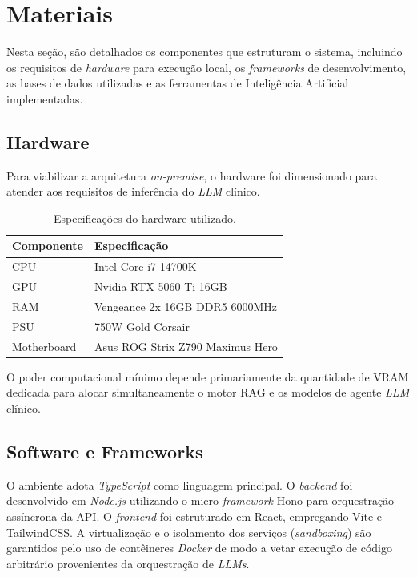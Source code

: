 \documentclass[12pt]{article}
\begin{document}

\section{Materiais}

Nesta seção, são detalhados os componentes que estruturam o sistema, incluindo os requisitos de \textit{hardware} para execução local, os \textit{frameworks} de desenvolvimento, as bases de dados utilizadas e as ferramentas de Inteligência Artificial implementadas.

\subsection{Hardware}
Para viabilizar a arquitetura \textit{on-premise}, o hardware foi dimensionado para atender aos requisitos de inferência do \textit{LLM} clínico.

\begin{table}[H]
  \centering
  \caption{Especificações do hardware utilizado.}
  \label{tab:hardware_specs}
  \small
  \begin{tabularx}{\textwidth}{l X}
    \toprule
    \textbf{Componente} & \textbf{Especificação}           \\
    \midrule
    CPU                 & Intel Core i7-14700K             \\
    GPU                 & Nvidia RTX 5060 Ti 16GB          \\
    RAM                 & Vengeance 2x 16GB DDR5 6000MHz   \\
    PSU                 & 750W Gold Corsair                \\
    Motherboard         & Asus ROG Strix Z790 Maximus Hero \\
    \bottomrule
  \end{tabularx}
\end{table}

O poder computacional mínimo depende primariamente da quantidade de VRAM dedicada para alocar simultaneamente o motor RAG e os modelos de agente \textit{LLM} clínico.

\subsection{Software e Frameworks}

O ambiente adota \textit{TypeScript} como linguagem principal.
O \textit{backend} foi desenvolvido em \textit{Node.js} utilizando o micro-\textit{framework} Hono para orquestração assíncrona da API.
O \textit{frontend} foi estruturado em React, empregando Vite e TailwindCSS.
A virtualização e o isolamento dos serviços (\textit{sandboxing}) são garantidos pelo uso de contêineres \textit{Docker} de modo a vetar execução de código arbitrário provenientes da orquestração de \textit{LLMs}.
\end{document}
